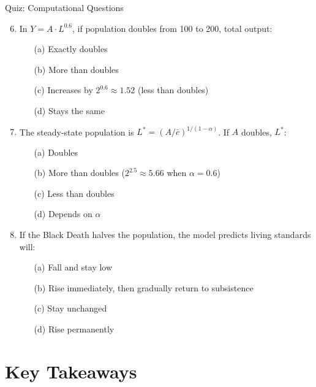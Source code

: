 \documentclass[aspectratio=169, 10pt]{beamer}
\begin{document}
\begin{frame}{Quiz: Computational Questions}
\begin{enumerate}
  \setcounter{enumi}{5}
  \item In $Y = A \cdot L^{0.6}$, if population doubles from 100 to 200,
        total output:
        \begin{enumerate}
          \item[(a)] Exactly doubles
          \item[(b)] More than doubles
          \item[(c)] \alert{Increases by $2^{0.6} \approx 1.52$
                     (less than doubles)}
          \item[(d)] Stays the same
        \end{enumerate}
  \item The steady-state population is
        $L^* = (A/\bar{c})^{1/(1-\alpha)}$.
        If $A$ doubles, $L^*$:
        \begin{enumerate}
          \item[(a)] Doubles
          \item[(b)] \alert{More than doubles
                     ($2^{2.5} \approx 5.66$ when $\alpha = 0.6$)}
          \item[(c)] Less than doubles
          \item[(d)] Depends on $\alpha$
        \end{enumerate}
  \item If the Black Death halves the population, the model predicts
        living standards will:
        \begin{enumerate}
          \item[(a)] Fall and stay low
          \item[(b)] \alert{Rise immediately, then gradually return
                     to subsistence}
          \item[(c)] Stay unchanged
          \item[(d)] Rise permanently
        \end{enumerate}
\end{enumerate}
\end{frame}

\section{Key Takeaways}
\end{document}
